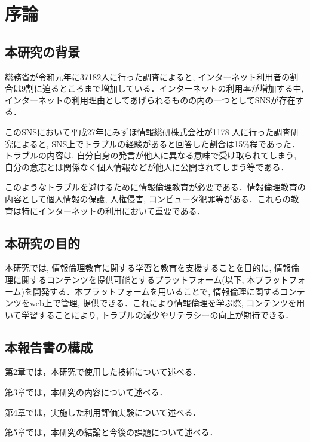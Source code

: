 \section{序論}\label{sec1}
\subsection{本研究の背景}

総務省が令和元年に37182人に行った調査によると, インターネット利用者の割合は9割に迫るところまで増加している\cite{soumu}．インターネットの利用率が増加する中, インターネットの利用理由としてあげられるものの内の一つとしてSNSが存在する．
  
このSNSにおいて平成27年にみずほ情報総研株式会社が1178 人に行った調査研究\cite{mizuho}によると, SNS上でトラブルの経験があると回答した割合は15\%程であった．トラブルの内容は, 自分自身の発言が他人に異なる意味で受け取られてしまう, 自分の意志とは関係なく個人情報などが他人に公開されてしまう等である．

このようなトラブルを避けるために情報倫理教育が必要である．情報倫理教育の内容として個人情報の保護, 人権侵害, コンピュータ犯罪等がある．これらの教育は特にインターネットの利用において重要である\cite{moraru}．

\subsection{本研究の目的}

本研究では, 情報倫理教育に関する学習と教育を支援することを目的に, 情報倫理に関するコンテンツを提供可能とするプラットフォーム(以下, 本プラットフォーム)を開発する．本プラットフォームを用いることで, 情報倫理に関するコンテンツをweb上で管理, 提供できる．これにより情報倫理を学ぶ際, コンテンツを用いて学習することにより, トラブルの減少やリテラシーの向上が期待できる．

\subsection{本報告書の構成}

第2章では，本研究で使用した技術について述べる．

第3章では，本研究の内容について述べる．

第4章では，実施した利用評価実験について述べる．

第5章では，本研究の結論と今後の課題について述べる．
